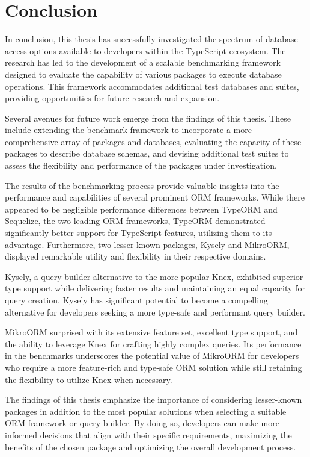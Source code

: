\chapter{Conclusion}

In conclusion, this thesis has successfully investigated the spectrum of
database access options available to developers within the TypeScript ecosystem.
The research has led to the development of a scalable benchmarking framework
designed to evaluate the capability of various packages to execute database
operations. This framework accommodates additional test databases and suites,
providing opportunities for future research and expansion.

Several avenues for future work emerge from the findings of this thesis. These
include extending the benchmark framework to incorporate a more comprehensive
array of packages and databases, evaluating the capacity of these packages to
describe database schemas, and devising additional test suites to assess the
flexibility and performance of the packages under investigation.

The results of the benchmarking process provide valuable insights into the
performance and capabilities of several prominent ORM frameworks. While there
appeared to be negligible performance differences between TypeORM and Sequelize,
the two leading ORM frameworks, TypeORM demonstrated significantly better
support for TypeScript features, utilizing them to its advantage. Furthermore,
two lesser-known packages, Kysely and MikroORM, displayed remarkable utility and
flexibility in their respective domains.

Kysely, a query builder alternative to the more popular Knex, exhibited superior
type support while delivering faster results and maintaining an equal capacity
for query creation. Kysely has significant potential to become a compelling
alternative for developers seeking a more type-safe and performant query
builder.

MikroORM surprised with its extensive feature set, excellent type support, and
the ability to leverage Knex for crafting highly complex queries. Its
performance in the benchmarks underscores the potential value of MikroORM for
developers who require a more feature-rich and type-safe ORM solution while
still retaining the flexibility to utilize Knex when necessary.

The findings of this thesis emphasize the importance of considering lesser-known
packages in addition to the most popular solutions when selecting a suitable ORM
framework or query builder. By doing so, developers can make more informed
decisions that align with their specific requirements, maximizing the benefits
of the chosen package and optimizing the overall development process.

